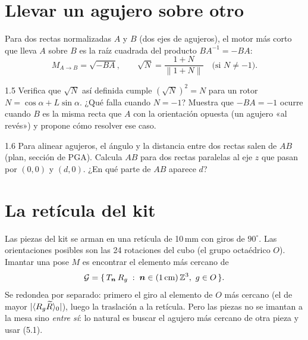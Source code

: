 \documentclass[11pt,a4paper]{article}
\begin{document}
\section{Llevar un agujero sobre otro}

Para dos rectas normalizadas $A$ y $B$ (dos ejes de agujeros), el motor más corto que lleva $A$ sobre $B$ es la raíz
cuadrada del producto $BA^{-1} = -BA$:
\begin{equation}
  M_{A\to B} = \sqrt{-BA},\qquad \sqrt{N} = \frac{1 + N}{\lVert 1 + N\rVert}\quad\text{(si }N\neq-1\text{)}.
\end{equation}

\begin{ejercicio}{1.5}
Verifica que $\sqrt N$ así definida cumple $(\sqrt N)^2 = N$ para un rotor $N = \cos\alpha + L\sin\alpha$. ¿Qué falla
cuando $N = -1$? Muestra que $-BA = -1$ ocurre cuando $B$ es la misma recta que $A$ con la orientación opuesta (un
agujero «al revés») y propone cómo resolver ese caso.
\end{ejercicio}

\begin{ejercicio}{1.6}
Para alinear agujeros, el ángulo y la distancia entre dos rectas salen de $AB$ (plan, sección de PGA). Calcula $AB$ para
dos rectas paralelas al eje $z$ que pasan por $(0,0)$ y $(d,0)$. ¿En qué parte de $AB$ aparece $d$?
\end{ejercicio}

\section{La retícula del kit}

Las piezas del kit se arman en una retícula de 10\,mm con giros de $90^\circ$. Las orientaciones posibles son las 24
rotaciones del cubo (el grupo octaédrico $O$). Imantar una pose $M$ es encontrar el elemento más cercano de
\begin{equation}
  \mathcal{G} = \{\,T_{\bm{n}}\,R_g \;:\; \bm{n}\in(1\,\mathrm{cm})\,\mathbb{Z}^3,\ g\in O\,\}.
\end{equation}
Se redondea por separado: primero el giro al elemento de $O$ más cercano (el de mayor $\lvert\langle R_g\widetilde{R}\rangle_0\rvert$),
luego la traslación a la retícula. Pero las piezas no se imantan a la mesa sino \emph{entre sí}: lo natural es buscar
el agujero más cercano de otra pieza y usar (5.1).
\end{document}
